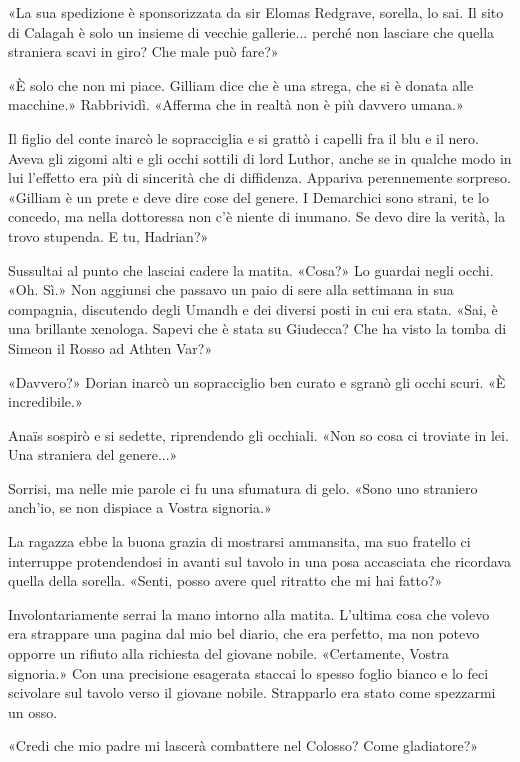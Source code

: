 «La sua spedizione è sponsorizzata da sir Elomas Redgrave, sorella, lo
sai. Il sito di Calagah è solo un insieme di vecchie gallerie... perché
non lasciare che quella straniera scavi in giro? Che male può fare?»

«È solo che non mi piace. Gilliam dice che è una strega, che si è donata
alle macchine.» Rabbrividì. «Afferma che in realtà non è più davvero
umana.»

Il figlio del conte inarcò le sopracciglia e si grattò i capelli fra il
blu e il nero. Aveva gli zigomi alti e gli occhi sottili di lord Luthor,
anche se in qualche modo in lui l'effetto era più di sincerità che di
diffidenza. Appariva perennemente sorpreso. «Gilliam è un prete e deve
dire cose del genere. I Demarchici sono strani, te lo concedo, ma nella
dottoressa non c'è niente di inumano. Se devo dire la verità, la trovo
stupenda. E tu, Hadrian?»

Sussultai al punto che lasciai cadere la matita. «Cosa?» Lo guardai
negli occhi. «Oh. Sì.» Non aggiunsi che passavo un paio di sere alla
settimana in sua compagnia, discutendo degli Umandh e dei diversi posti
in cui era stata. «Sai, è una brillante xenologa. Sapevi che è stata su
Giudecca? Che ha visto la tomba di Simeon il Rosso ad Athten Var?»

«Davvero?» Dorian inarcò un sopracciglio ben curato e sgranò gli occhi
scuri. «È incredibile.»

Anaïs sospirò e si sedette, riprendendo gli occhiali. «Non so cosa ci
troviate in lei. Una straniera del genere...»

Sorrisi, ma nelle mie parole ci fu una sfumatura di gelo. «Sono uno
straniero anch'io, se non dispiace a Vostra signoria.»

La ragazza ebbe la buona grazia di mostrarsi ammansita, ma suo fratello
ci interruppe protendendosi in avanti sul tavolo in una posa accasciata
che ricordava quella della sorella. «Senti, posso avere quel ritratto
che mi hai fatto?»

Involontariamente serrai la mano intorno alla matita. L'ultima cosa che
volevo era strappare una pagina dal mio bel diario, che era perfetto, ma
non potevo opporre un rifiuto alla richiesta del giovane nobile.
«Certamente, Vostra signoria.» Con una precisione esagerata staccai lo
spesso foglio bianco e lo feci scivolare sul tavolo verso il giovane
nobile. Strapparlo era stato come spezzarmi un osso.

«Credi che mio padre mi lascerà combattere nel Colosso? Come
gladiatore?»

